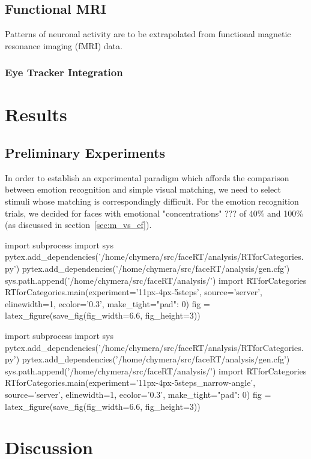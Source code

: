     \section{Functional MRI}
    Patterns of neuronal activity are to be extrapolated from functional magnetic resonance imaging (fMRI) data.
	\subsection{Eye Tracker Integration}\label{sec:m_fm_eti}
\chapter{Results}
    \section{Preliminary Experiments}\label{sec:r_pe}
    In order to establish an experimental paradigm which affords the comparison between emotion recognition and simple visual matching, we need to select stimuli whose matching is correspondingly difficult.
    For the emotion recognition trials, we decided for faces with emotional "concentrations" ??? of 40\% and 100\% (as discussed in section~\ref{sec:m_vs_ef}).
    \begin{pycode}
import subprocess
import sys
pytex.add_dependencies('/home/chymera/src/faceRT/analysis/RTforCategories.py')
pytex.add_dependencies('/home/chymera/src/faceRT/analysis/gen.cfg')
sys.path.append('/home/chymera/src/faceRT/analysis/')
import RTforCategories
RTforCategories.main(experiment='11px-4px-5steps', source='server', elinewidth=1, ecolor='0.3', make_tight={"pad": 0})
fig = latex_figure(save_fig(fig_width=6.6, fig_height=3))
    \end{pycode}
\begin{pycode}
import subprocess
import sys
pytex.add_dependencies('/home/chymera/src/faceRT/analysis/RTforCategories.py')
pytex.add_dependencies('/home/chymera/src/faceRT/analysis/gen.cfg')
sys.path.append('/home/chymera/src/faceRT/analysis/')
import RTforCategories
RTforCategories.main(experiment='11px-4px-5steps_narrow-angle', source='server', elinewidth=1, ecolor='0.3', make_tight={"pad": 0})
fig = latex_figure(save_fig(fig_width=6.6, fig_height=3))
    \end{pycode}
\chapter{Discussion}
